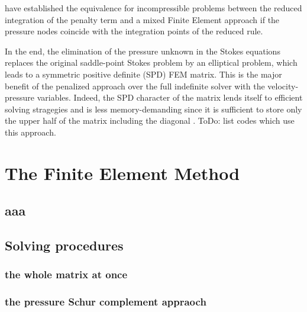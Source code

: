 \documentclass[a4paper]{article}
\begin{document}
\cite{mahu78} have established the equivalence for incompressible problems between the reduced integration
of the penalty term and a mixed Finite Element approach if the pressure nodes coincide with the integration points of the reduced rule.

In the end, the elimination of the pressure unknown in the Stokes equations
replaces the original saddle-point Stokes problem \cite{begl05} by an elliptical problem, 
which leads to a symmetric positive definite (SPD) FEM matrix. 
This is the major benefit of the penalized approach 
over the full indefinite solver with the velocity-pressure variables. Indeed, the SPD character of the matrix lends itself 
to efficient solving stragegies and is less memory-demanding since it is sufficient to store only the upper half of the matrix including the diagonal
\cite{gova}
.
ToDo: list codes which use this approach.





\newpage
\section{The Finite Element Method}

\subsection{aaa}


\subsection{Solving procedures}

\subsubsection{the whole matrix at once}

\subsubsection{the pressure Schur complement appraoch}



\newpage
\end{document}
